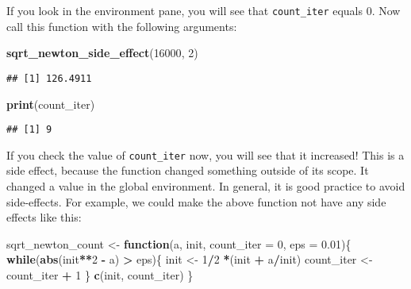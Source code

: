 \documentclass[
]{article}
\newenvironment{Shaded}{\begin{snugshade}}{\end{snugshade}}
\newcommand{\ControlFlowTok}[1]{\textcolor[rgb]{0.13,0.29,0.53}{\textbf{#1}}}
\newcommand{\DataTypeTok}[1]{\textcolor[rgb]{0.13,0.29,0.53}{#1}}
\newcommand{\DecValTok}[1]{\textcolor[rgb]{0.00,0.00,0.81}{#1}}
\newcommand{\FloatTok}[1]{\textcolor[rgb]{0.00,0.00,0.81}{#1}}
\newcommand{\KeywordTok}[1]{\textcolor[rgb]{0.13,0.29,0.53}{\textbf{#1}}}
\newcommand{\NormalTok}[1]{#1}
\newcommand{\OperatorTok}[1]{\textcolor[rgb]{0.81,0.36,0.00}{\textbf{#1}}}
\newcommand{\StringTok}[1]{\textcolor[rgb]{0.31,0.60,0.02}{#1}}
\begin{document}
If you look in the environment pane, you will see that \texttt{count\_iter} equals 0. Now call this
function with the following arguments:

\begin{Shaded}
\begin{Highlighting}[]
\KeywordTok{sqrt\_newton\_side\_effect}\NormalTok{(}\DecValTok{16000}\NormalTok{, }\DecValTok{2}\NormalTok{)}
\end{Highlighting}
\end{Shaded}

\begin{verbatim}
## [1] 126.4911
\end{verbatim}

\begin{Shaded}
\begin{Highlighting}[]
\KeywordTok{print}\NormalTok{(count\_iter)}
\end{Highlighting}
\end{Shaded}

\begin{verbatim}
## [1] 9
\end{verbatim}

If you check the value of \texttt{count\_iter} now, you will see that it increased! This is a side effect,
because the function changed something outside of its scope. It changed a value in the global
environment. In general, it is good practice to avoid side-effects. For example, we could make the
above function not have any side effects like this:

\begin{Shaded}
\begin{Highlighting}[]
\NormalTok{sqrt\_newton\_count \textless{}{-}}\StringTok{ }\ControlFlowTok{function}\NormalTok{(a, init, }\DataTypeTok{count\_iter =} \DecValTok{0}\NormalTok{, }\DataTypeTok{eps =} \FloatTok{0.01}\NormalTok{)\{}
    \ControlFlowTok{while}\NormalTok{(}\KeywordTok{abs}\NormalTok{(init}\OperatorTok{**}\DecValTok{2} \OperatorTok{{-}}\StringTok{ }\NormalTok{a) }\OperatorTok{\textgreater{}}\StringTok{ }\NormalTok{eps)\{}
\NormalTok{        init \textless{}{-}}\StringTok{ }\DecValTok{1}\OperatorTok{/}\DecValTok{2} \OperatorTok{*}\NormalTok{(init }\OperatorTok{+}\StringTok{ }\NormalTok{a}\OperatorTok{/}\NormalTok{init)}
\NormalTok{        count\_iter \textless{}{-}}\StringTok{ }\NormalTok{count\_iter }\OperatorTok{+}\StringTok{ }\DecValTok{1}
\NormalTok{    \}}
    \KeywordTok{c}\NormalTok{(init, count\_iter)}
\NormalTok{\}}
\end{Highlighting}
\end{Shaded}
\end{document}
